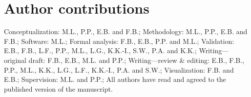 \section*{Author contributions}

Conceptualization: M.L., P.P., E.B. and F.B.; 
Methodology: M.L., P.P., E.B. and F.B.; 
Software: M.L.; 
Formal analysis: F.B., E.B., P.P. and M.L.; 
Validation: E.B., F.B., L.F., P.P., M.L., L.G., K.K.-I., S.W., P.A. and K.K.; 
Writing---original draft: F.B., E.B., M.L. and P.P.; 
Writing---review \& editing: E.B., F.B., P.P., M.L., K.K., L.G., L.F., K.K.-I., P.A. and S.W.; 
Visualization: F.B. and E.B.; 
Supervision: M.L. and P.P.;
All authors have read and agreed to the published version of the manuscript.